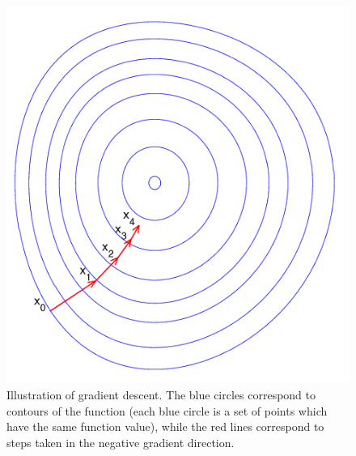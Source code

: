 \begin{figure}[h]
\begin{center}
   \includegraphics[width=0.6\columnwidth]{figs/intro/graddescent.png}
 \caption{\label{fig:graddescent} Illustration of gradient descent. The blue circles correspond to contours of the function (each blue circle is a set of points which have the same function value), while the red lines correspond to steps taken in the negative gradient direction.}
\end{center}
\end{figure}


